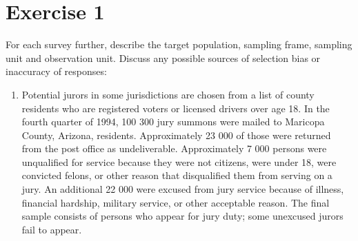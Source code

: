 \documentclass[12pt]{article}
\begin{document}
\section*{Exercise 1}

For each survey further, describe the target population, sampling frame, sampling unit and observation unit. Discuss any possible sources of selection bias or inaccuracy of responses:
\begin{enumerate}
\item Potential jurors in some jurisdictions are chosen from a list of county residents who are registered voters or licensed drivers over age 18. In the fourth quarter of 1994, 100 300 jury summons were mailed to Maricopa County, Arizona, residents. Approximately 23 000 of those were returned from the post office as undeliverable. Approximately 7 000 persons were unqualified for service because they were not citizens, were under 18, were convicted felons, or other reason that disqualified them from serving on a jury. An additional 22 000 were excused from jury service because of illness, financial
hardship, military service, or other acceptable reason. The final sample consists of persons who appear for jury duty; some unexcused jurors fail to appear.\\


\end{enumerate}
\end{document}
